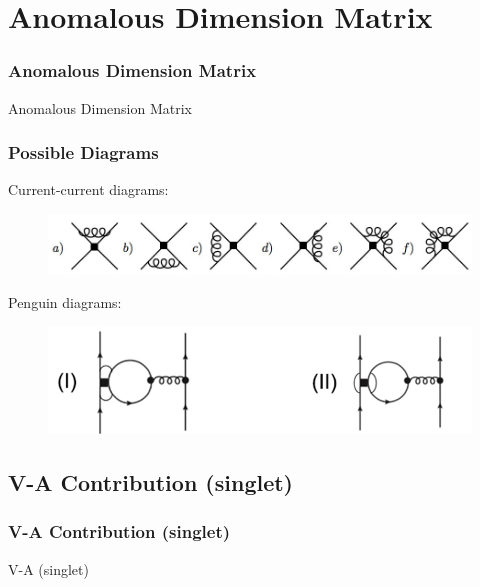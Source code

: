 \documentclass{beamer}
\begin{document}
\section{Anomalous Dimension Matrix}

\begin{frame}
\frametitle{Anomalous Dimension Matrix}
\huge\centering
Anomalous Dimension Matrix
\end{frame}


\begin{frame}
\frametitle{Possible Diagrams}
Current-current diagrams:
\begin{figure}
\centering
\includegraphics[width=\textwidth]{Figures/currentCurrentDiagrams.jpg}
\end{figure}
Penguin diagrams:
\begin{figure}
\centering
\includegraphics[width=\textwidth]{Figures/penguinDiagrams.jpg}
\end{figure}
\end{frame}

\subsection{V-A Contribution (singlet)}
\begin{frame}
\frametitle{V-A Contribution (singlet)}
\huge\centering
V-A (singlet) 
\end{frame}
\end{document}
